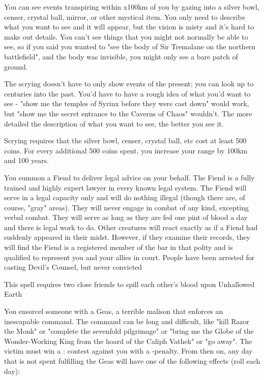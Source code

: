{\OCCULT[
  Name=Descry,
  Link=occultism-descry,
  Success=2,
  Cost=500+,
  Widdershins=0
]

You can see events transpiring within \LVL x100km of you by gazing into a silver bowl, censer, crystal ball, mirror, or other mystical item.  You only need to describe what you want to see and it will appear, but the vision is misty and it's hard to make out details.  You can't see things that you might not normally be able to see, so if you said you wanted to "see the body of Sir Tremalane on the northern battlefield", and the body was invisible, you might only see a bare patch of ground.  

The scrying doesn't have to only show events of the present; you can look up to \LVL centuries into the past.  You'd have to have a rough idea of what you'd want to see - "show me the temples of Syrinx before they were cast down" would work, but "show me the secret entrance to the Caverns of Chaos" wouldn't.  The more detailed the description of what you want to see, the better you see it.

Scrying requires that the silver bowl, censer, crystal ball, etc cost at least 500 coins.  For every additional 500 coins spent, you increase your range by 100km and 100 years.

\OCCULT[
  Name=Devil's Counsel,
  Link=occultism-devils-counsel,
  Success=4,
  Cost=See below,
  Widdershins=2
]

You summon a Fiend to deliver legal advice on your behalf.  The Fiend is a fully trained and highly expert lawyer in every known legal system. The Fiend will serve in a legal capacity only and will do nothing illegal (though there are, of course, "gray" areas). They will never engage in combat of any kind, excepting verbal combat. They will serve as long as they are fed one pint of blood a day and there is legal work to do. Other creatures will react exactly as if a Fiend had suddenly appeared in their midst. However, if they examine their records, they will find the Fiend is a registered member of the bar in that polity and is qualified to represent you and your allies in court. People have been arrested for casting Devil's Counsel, but never convicted

This spell requires two close friends to spill each other's blood upon Unhallowed Earth

\OCCULT[
  Name=Geas,
  Link=occultism-geas,
  Success=9,
  Cost=See below,
  Widdershins=3
]

You ensorcel someone with a Geas, a terrible malison that enforces an inescapable command. The command can be long and difficult, like "kill Razor the Monk" or "complete the sevenfold pilgrimage" or "bring me the Globe of the Wonder-Working King from the hoard of the Caliph Vathek" or "go away". The victim must win a \RB : \FOC contest against you with a -\LVL penalty.  From then on, any day that is not spent fulfilling the Geas will have one of the following effects (roll each day):

}
